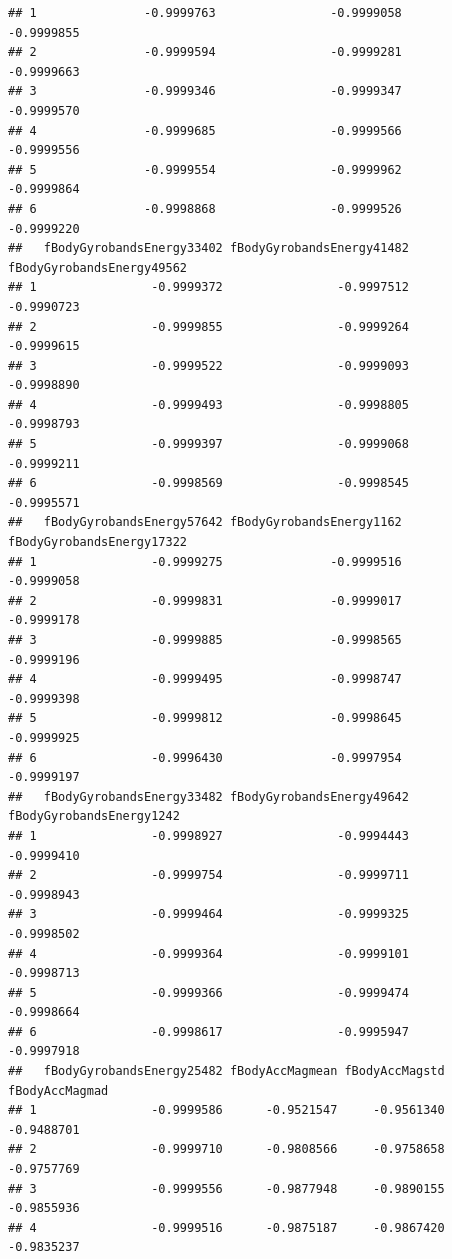 \documentclass[
]{article}
\begin{document}
\begin{verbatim}
## 1               -0.9999763                -0.9999058                -0.9999855
## 2               -0.9999594                -0.9999281                -0.9999663
## 3               -0.9999346                -0.9999347                -0.9999570
## 4               -0.9999685                -0.9999566                -0.9999556
## 5               -0.9999554                -0.9999962                -0.9999864
## 6               -0.9998868                -0.9999526                -0.9999220
##   fBodyGyrobandsEnergy33402 fBodyGyrobandsEnergy41482 fBodyGyrobandsEnergy49562
## 1                -0.9999372                -0.9997512                -0.9990723
## 2                -0.9999855                -0.9999264                -0.9999615
## 3                -0.9999522                -0.9999093                -0.9998890
## 4                -0.9999493                -0.9998805                -0.9998793
## 5                -0.9999397                -0.9999068                -0.9999211
## 6                -0.9998569                -0.9998545                -0.9995571
##   fBodyGyrobandsEnergy57642 fBodyGyrobandsEnergy1162 fBodyGyrobandsEnergy17322
## 1                -0.9999275               -0.9999516                -0.9999058
## 2                -0.9999831               -0.9999017                -0.9999178
## 3                -0.9999885               -0.9998565                -0.9999196
## 4                -0.9999495               -0.9998747                -0.9999398
## 5                -0.9999812               -0.9998645                -0.9999925
## 6                -0.9996430               -0.9997954                -0.9999197
##   fBodyGyrobandsEnergy33482 fBodyGyrobandsEnergy49642 fBodyGyrobandsEnergy1242
## 1                -0.9998927                -0.9994443               -0.9999410
## 2                -0.9999754                -0.9999711               -0.9998943
## 3                -0.9999464                -0.9999325               -0.9998502
## 4                -0.9999364                -0.9999101               -0.9998713
## 5                -0.9999366                -0.9999474               -0.9998664
## 6                -0.9998617                -0.9995947               -0.9997918
##   fBodyGyrobandsEnergy25482 fBodyAccMagmean fBodyAccMagstd fBodyAccMagmad
## 1                -0.9999586      -0.9521547     -0.9561340     -0.9488701
## 2                -0.9999710      -0.9808566     -0.9758658     -0.9757769
## 3                -0.9999556      -0.9877948     -0.9890155     -0.9855936
## 4                -0.9999516      -0.9875187     -0.9867420     -0.9835237

\end{verbatim}
\end{document}
